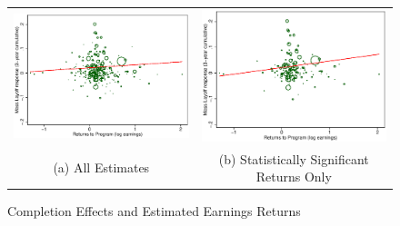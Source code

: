 \begin{figure}[h]\centering
\caption{Completion Effects and Estimated Earnings Returns }
\begin{tabular}{cc}
\includegraphics[scale=0.5]{./figures/scatter_bycip_all.eps} &\includegraphics[scale=0.5]{./figures/scatter_bycip_sigret.eps}\\
(a) All Estimates&(b) Statistically Significant Returns Only\\

\end{tabular}
\end{figure}
